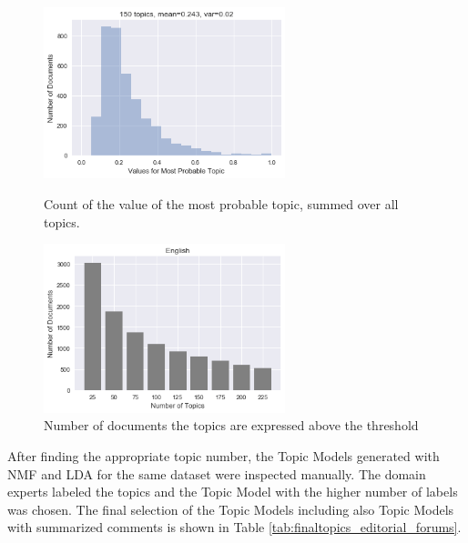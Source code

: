 \begin{figure}
	\centering
	\begin{minipage}[b]{0.5\textwidth}
		\includegraphics[width=7cm]{gfx/Hyperparams/150topics_English_nmf.png}
		\caption{Count of the value of the most probable topic, summed over all topics.}
		\label{fig:mean}
	\end{minipage}%
	\begin{minipage}[b]{0.5\textwidth}
		\includegraphics[width=7cm]{gfx/Hyperparams/English_nmf_Comments.png}
		\caption{Number of documents the topics are expressed above the threshold}
		\label{fig:topic number}
	\end{minipage}
\end{figure}	

After finding the appropriate topic number, the Topic Models generated with \ac{NMF} and \ac{LDA} for the same dataset were inspected manually. The domain experts labeled the topics and the Topic Model with the higher number of labels was chosen. The final selection of the Topic Models including also Topic Models with summarized comments is shown in Table \ref{tab:finaltopics_editorial_forums}.


